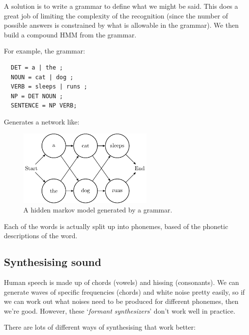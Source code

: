 A solution is to write a grammar to define what we might be said. This does a
great job of limiting the complexity of the recognition (since the number of
possible answers is constrained by what is allowable in the grammar). We then
build a compound HMM from the grammar.

For example, the grammar:

\begin{verbatim}
  DET = a | the ;
  NOUN = cat | dog ;
  VERB = sleeps | runs ;
  NP = DET NOUN ;
  SENTENCE = NP VERB;
\end{verbatim}

Generates a network like:

\begin{figure}[H]
  \centering
  \includegraphics[width=0.6\textwidth]{diagrams/generated-hmm}
  \caption{A hidden markov model generated by a grammar.}
  \label{fig:gen-hmm}
\end{figure}

Each of the words is actually split up into phonemes, based of the phonetic
descriptions of the word.

\subsection{Synthesising sound}

Human speech is made up of chords (vowels) and hissing (consonants). We can
generate waves of specific frequencies (chords) and white noise pretty easily,
so if we can work out what noises need to be produced for different phonemes,
then we're good. However, these `\textit{formant synthesizers}' don't work well
in practice.

There are lots of different ways of synthesising that work better:

